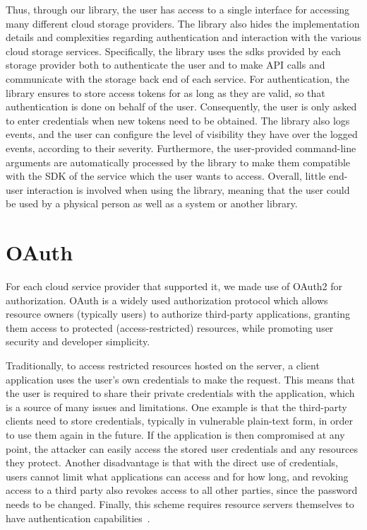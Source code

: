 Thus, through our library, the user has access to a single interface for accessing many different cloud storage providers. The library also hides the implementation details and complexities regarding authentication and interaction with the various cloud storage services. Specifically, the library uses the \acp{sdk} provided by each storage provider both to authenticate the user and to make API calls and communicate with the storage back end of each service. For authentication, the library ensures to store access tokens for as long as they are valid, so that authentication is done on behalf of the user. Consequently, the user is only asked to enter credentials when new tokens need to be obtained. The library also logs events, and the user can configure the level of visibility they have over the logged events, according to their severity. Furthermore, the user-provided command-line arguments are automatically processed by the library to make them compatible with the SDK of the service which the user wants to access. Overall, little end-user interaction is involved when using the library, meaning that the user could be used by a physical person as well as a system or another library.


\section{OAuth}
For each cloud service provider that supported it, we made use of OAuth2 for authorization. OAuth is a widely used authorization protocol which allows resource owners (typically users) to authorize third-party applications, granting them access to protected (access-restricted) resources, while promoting user security and developer simplicity.  

Traditionally, to access restricted resources hosted on the server, a client application uses the user's own credentials  to make the request. This means that the user is required to share their private credentials with the application, which is a source of many issues and limitations. One example is that the third-party clients need to store credentials, typically in vulnerable plain-text form,  in order to use them again in the future. If the application is then compromised at any point, the attacker can easily access the stored user credentials and any resources they protect. Another disadvantage is that with the direct use of credentials, users cannot limit what applications can access and for how long, and revoking access to a third party also revokes access to all other parties, since the password needs to be changed. Finally, this scheme requires resource servers themselves to have authentication capabilities~\cite{oauth}.

